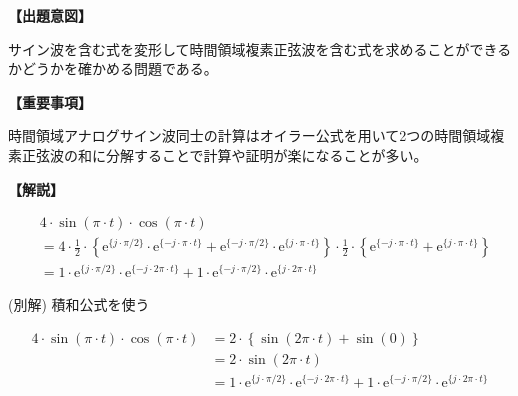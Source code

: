 \noindent \textbf{【出題意図】}

\bigskip
\noindent サイン波を含む式を変形して時間領域複素正弦波を含む式を求めることができるかどうかを確かめる問題である。

\vspace{1em}
\noindent \textbf{【重要事項】}

\medskip
\noindent 時間領域アナログサイン波同士の計算はオイラー公式を用いて2つの時間領域複素正弦波の和に分解することで計算や証明が楽になることが多い。

\bigskip

\vspace{1em}
\noindent \textbf{【解説】}

\bigskip

\begin{align*}
& 4 \cdot \sin(\pi \cdot t) \cdot \cos( \pi \cdot t) \\
& = 
4 \cdot
\frac{1}{2}\cdot\left \{
  \textrm{e}^{\{ j \cdot \pi/2 \}} \cdot \textrm{e}^{\{-j \cdot \pi \cdot t \}} 
+ \textrm{e}^{\{-j \cdot \pi/2 \}} \cdot \textrm{e}^{\{ j \cdot \pi \cdot t \}} 
\right \}
\cdot
\frac{1}{2}\cdot\left \{
  \textrm{e}^{\{-j \cdot \pi \cdot t \}} 
+ \textrm{e}^{\{ j \cdot \pi \cdot t \}} 
\right \} \\
& =
  1 \cdot \textrm{e}^{\{ j \cdot \pi/2 \}} \cdot \textrm{e}^{\{-j \cdot 2\pi \cdot t \}}
+ 1 \cdot \textrm{e}^{\{-j \cdot \pi/2 \}} \cdot \textrm{e}^{\{ j \cdot 2\pi \cdot t \}}
\end{align*}

\bigskip
(別解) 積和公式を使う

\begin{align*}
4 \cdot \sin( \pi \cdot t) \cdot \cos( \pi \cdot t)
&= 2 \cdot \left \{ \sin( 2\pi \cdot t ) + \sin( 0 ) \right \}\\
&= 2 \cdot \sin( 2\pi \cdot t ) \\
& =
  1 \cdot \textrm{e}^{\{ j \cdot \pi/2 \}} \cdot \textrm{e}^{\{-j \cdot 2\pi \cdot t \}}
+ 1 \cdot \textrm{e}^{\{-j \cdot \pi/2 \}} \cdot \textrm{e}^{\{ j \cdot 2\pi \cdot t \}}
\end{align*}

